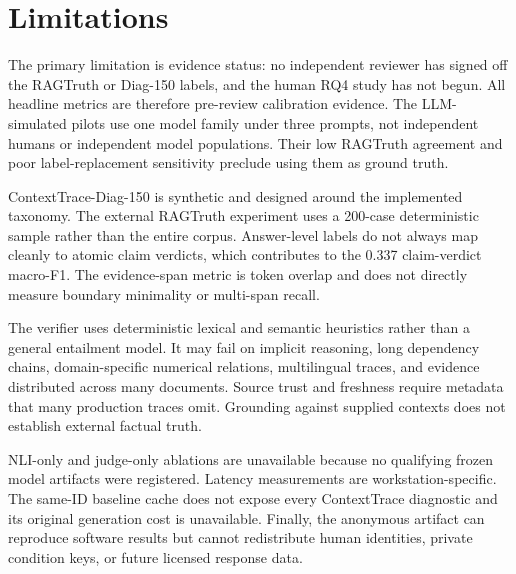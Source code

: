 \section{Limitations}
The primary limitation is evidence status: no independent reviewer has signed
off the RAGTruth or Diag-150 labels, and the human RQ4 study has not begun. All
headline metrics are therefore pre-review calibration evidence. The
LLM-simulated pilots use one model family under three prompts, not independent
humans or independent model populations. Their low RAGTruth agreement and poor
label-replacement sensitivity preclude using them as ground truth.

ContextTrace-Diag-150 is synthetic and designed around the implemented taxonomy.
The external RAGTruth experiment uses a 200-case deterministic sample rather
than the entire corpus. Answer-level labels do not always map cleanly to atomic
claim verdicts, which contributes to the 0.337 claim-verdict macro-F1. The
evidence-span metric is token overlap and does not directly measure boundary
minimality or multi-span recall.

The verifier uses deterministic lexical and semantic heuristics rather than a
general entailment model. It may fail on implicit reasoning, long dependency
chains, domain-specific numerical relations, multilingual traces, and evidence
distributed across many documents. Source trust and freshness require metadata
that many production traces omit. Grounding against supplied contexts does not
establish external factual truth.

NLI-only and judge-only ablations are unavailable because no qualifying frozen
model artifacts were registered. Latency measurements are workstation-specific.
The same-ID baseline cache does not expose every ContextTrace diagnostic and its
original generation cost is unavailable. Finally, the anonymous artifact can
reproduce software results but cannot redistribute human identities, private
condition keys, or future licensed response data.
